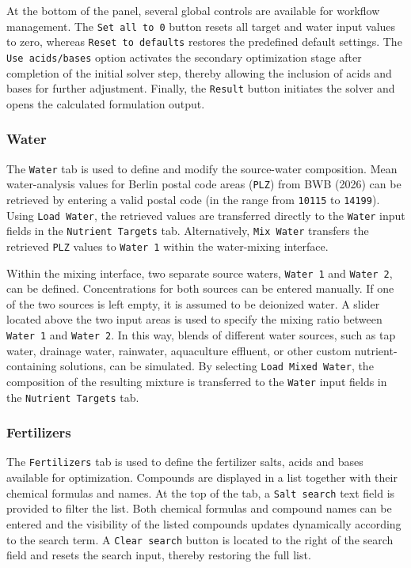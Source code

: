 \documentclass[
  letterpaper,
  DIV=11,
  numbers=noendperiod]{scrreprt}
\begin{document}
At the bottom of the panel, several global controls are available for
workflow management. The \texttt{Set\ all\ to\ 0} button resets all
target and water input values to zero, whereas
\texttt{Reset\ to\ defaults} restores the predefined default settings.
The \texttt{Use\ acids/bases} option activates the secondary
optimization stage after completion of the initial solver step, thereby
allowing the inclusion of acids and bases for further adjustment.
Finally, the \texttt{Result} button initiates the solver and opens the
calculated formulation output.

\subsubsection{Water}\label{water}

The \texttt{Water} tab is used to define and modify the source-water
composition. Mean water-analysis values for Berlin postal code areas
(\texttt{PLZ}) from BWB (2026) can be retrieved by entering a valid
postal code (in the range from \texttt{10115} to \texttt{14199}). Using
\texttt{Load\ Water}, the retrieved values are transferred directly to
the \texttt{Water} input fields in the \texttt{Nutrient\ Targets} tab.
Alternatively, \texttt{Mix\ Water} transfers the retrieved \texttt{PLZ}
values to \texttt{Water\ 1} within the water-mixing interface.

Within the mixing interface, two separate source waters,
\texttt{Water\ 1} and \texttt{Water\ 2}, can be defined. Concentrations
for both sources can be entered manually. If one of the two sources is
left empty, it is assumed to be deionized water. A slider located above
the two input areas is used to specify the mixing ratio between
\texttt{Water\ 1} and \texttt{Water\ 2}. In this way, blends of
different water sources, such as tap water, drainage water, rainwater,
aquaculture effluent, or other custom nutrient-containing solutions, can
be simulated. By selecting \texttt{Load\ Mixed\ Water}, the composition
of the resulting mixture is transferred to the \texttt{Water} input
fields in the \texttt{Nutrient\ Targets} tab.

\subsubsection{Fertilizers}\label{fertilizers}

The \texttt{Fertilizers} tab is used to define the fertilizer salts,
acids and bases available for optimization. Compounds are displayed in a
list together with their chemical formulas and names. At the top of the
tab, a \texttt{Salt\ search} text field is provided to filter the list.
Both chemical formulas and compound names can be entered and the
visibility of the listed compounds updates dynamically according to the
search term. A \texttt{Clear\ search} button is located to the right of
the search field and resets the search input, thereby restoring the full
list.
\end{document}
